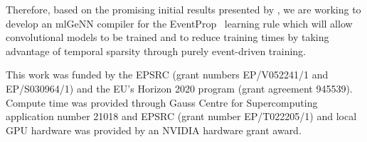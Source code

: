 \documentclass[sigconf]{acmart}
\begin{document}
Therefore, based on the promising initial results presented by \citet{NowotnyLoss2022}, we are working to develop an mlGeNN compiler for the EventProp~\citep{Wunderlich2021} learning rule which will allow convolutional models to be trained and to reduce training times by taking advantage of temporal sparsity through purely event-driven training.
\begin{acks}
This work was funded by the EPSRC (grant numbers EP/V052241/1 and EP/S030964/1) and the EU's Horizon 2020 program (grant agreement 945539).
Compute time was provided through Gauss Centre for Supercomputing application number 21018 and EPSRC (grant number EP/T022205/1) and local GPU hardware was provided by an NVIDIA hardware grant award.
\end{acks}

\balance


\end{document}
